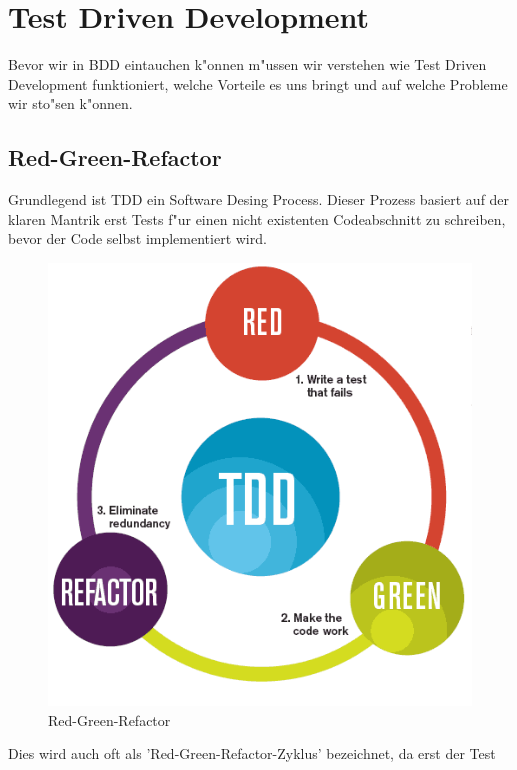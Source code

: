 \section{Test Driven Development}
  Bevor wir in BDD eintauchen k"onnen m"ussen wir verstehen wie Test Driven 
  Development funktioniert, welche Vorteile es uns bringt und auf welche 
  Probleme wir sto"sen k"onnen.

  \subsection{Red-Green-Refactor}
    Grundlegend ist TDD ein Software Desing Process. Dieser Prozess basiert auf 
    der klaren Mantrik erst Tests f"ur einen nicht existenten Codeabschnitt zu
    schreiben, bevor der Code selbst implementiert wird.\\
    \begin{figure}
      \vspace{-30pt}
      \begin{center}
        \includegraphics[scale=0.3]{assets/tdd_flow.png}
      \end{center}
      \caption{Red-Green-Refactor\cite{Osorio:2012}}
      \vspace{-15pt}
    \end{figure}
    Dies wird auch oft als 'Red-Green-Refactor-Zyklus' bezeichnet, da erst der Test
